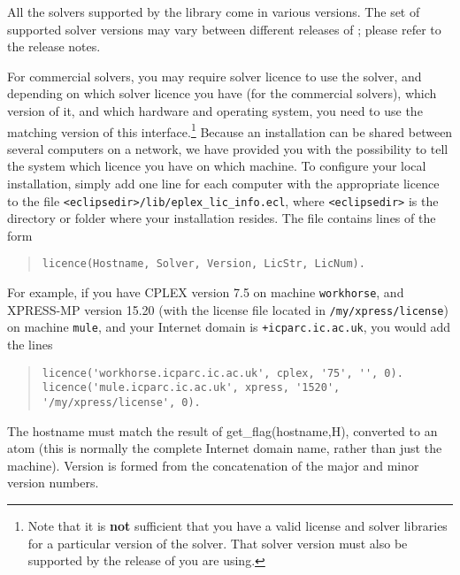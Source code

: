 All the solvers supported by the library come in various versions.
The set of supported solver versions may vary between different
releases of {\eclipse}; please refer to the release notes.

For commercial solvers, you may require solver licence to use the solver, and
depending on which solver licence you have (for the commercial solvers), 
which version of it, and which hardware and operating system,
you need to use the matching version of this interface.\footnote{Note that
it is {\bf not} sufficient that you have a valid license and solver
libraries for a particular version of the solver. That solver version must
also be supported by the release of {\eclipse} you are using.}
Because an {\eclipse} installation can be shared between several
computers on a network, we have provided you with the possibility
to tell the system which licence you have on which machine.
To configure your local installation, simply add one line for
each computer with the appropriate licence to the file
\verb+<eclipsedir>/lib/eplex_lic_info.ecl+, where \verb+<eclipsedir>+
is the directory or folder where your {\eclipse} installation resides.
The file contains lines of the form
\begin{quote} \begin{verbatim}
licence(Hostname, Solver, Version, LicStr, LicNum).
\end{verbatim} \end{quote}
For example, if you have CPLEX version 7.5 on machine \verb+workhorse+,
and XPRESS-MP version 15.20 (with the license file located in
\verb'/my/xpress/license') on machine \verb+mule+, and your Internet
domain is \verb'+icparc.ic.ac.uk',
you would add the lines
\begin{quote} \begin{verbatim}
licence('workhorse.icparc.ic.ac.uk', cplex, '75', '', 0).
licence('mule.icparc.ic.ac.uk', xpress, '1520', '/my/xpress/license', 0).         
\end{verbatim} \end{quote}
The hostname must match the result of get_flag(hostname,H),
converted to an atom (this is normally the complete Internet domain name,
rather than just the machine).
Version is formed from the concatenation of the major and minor version
numbers. 
